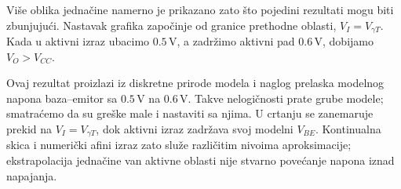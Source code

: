 Više oblika jednačine namerno je prikazano zato što pojedini rezultati mogu biti zbunjujući. Nastavak grafika započinje od granice prethodne oblasti, $V_I=V_{\gamma T}$. Kada u aktivni izraz ubacimo $0.5\,\mathrm{V}$, a zadržimo aktivni pad $0.6\,\mathrm{V}$, dobijamo $V_O>V_{CC}$.

Ovaj rezultat proizlazi iz diskretne prirode modela i naglog prelaska modelnog napona baza–emitor sa $0.5\,\mathrm{V}$ na $0.6\,\mathrm{V}$. Takve nelogičnosti prate grube modele; smatraćemo da su greške male i nastaviti sa njima. U crtanju se zanemaruje prekid na $V_I=V_{\gamma T}$, dok aktivni izraz zadržava svoj modelni $V_{BE}$. Kontinualna skica i numerički afini izraz zato služe različitim nivoima aproksimacije; ekstrapolacija jednačine van aktivne oblasti nije stvarno povećanje napona iznad napajanja.
